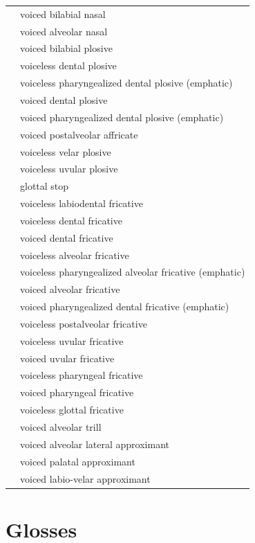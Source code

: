 \documentclass{article}
\begin{document}
\begin{xltabular}{\textwidth}{lL}
   & voiced bilabial nasal \\
   & voiced alveolar nasal \\
   & voiced bilabial plosive \\
   & voiceless dental plosive \\
   & voiceless pharyngealized dental plosive (emphatic) \\
   & voiced dental plosive \\
   & voiced pharyngealized dental plosive (emphatic) \\
   & voiced postalveolar affricate \\
   & voiceless velar plosive \\
   & voiceless uvular plosive \\
   & glottal stop \\
   & voiceless labiodental fricative \\
   & voiceless dental fricative \\
   & voiced dental fricative \\
   & voiceless alveolar fricative \\
   & voiceless pharyngealized alveolar fricative (emphatic) \\
   & voiced alveolar fricative \\
   & voiced pharyngealized dental fricative (emphatic) \\
   & voiceless postalveolar fricative \\
   & voiceless uvular fricative \\
   & voiced uvular fricative \\
   & voiceless pharyngeal fricative \\
   & voiced pharyngeal fricative \\
   & voiceless glottal fricative \\
   & voiced alveolar trill \\
   & voiced alveolar lateral approximant \\
   & voiced palatal approximant \\
   & voiced labio-velar approximant \\
\end{xltabular}

\newpage\section{Glosses}
\end{document}
